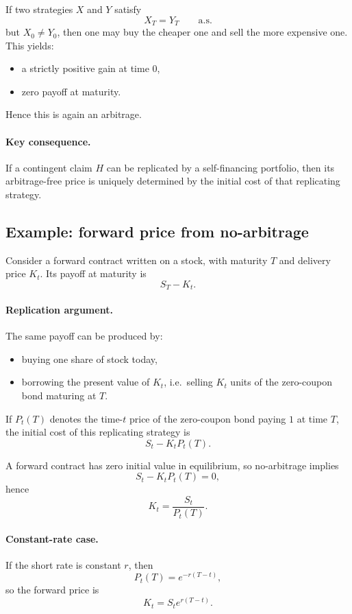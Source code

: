 \documentclass[11pt]{article}
\newcommand{\1}{\mathbf{1}}
\theoremstyle{plain}
\theoremstyle{definition}
\theoremstyle{remark}
\begin{document}
If two strategies \(X\) and \(Y\) satisfy
\[
X_T=Y_T \qquad \text{a.s.}
\]
but \(X_0\neq Y_0\), then one may buy the cheaper one and sell the more expensive one.
This yields:
\begin{itemize}
    \item a strictly positive gain at time \(0\),
    \item zero payoff at maturity.
\end{itemize}
Hence this is again an arbitrage.

\paragraph{Key consequence.}
If a contingent claim \(H\) can be replicated by a self-financing portfolio, then its arbitrage-free price is uniquely determined by the initial cost of that replicating strategy.

\subsection{Example: forward price from no-arbitrage}

Consider a forward contract written on a stock, with maturity \(T\) and delivery price \(K_t\).
Its payoff at maturity is
\[
S_T-K_t.
\]

\paragraph{Replication argument.}
The same payoff can be produced by:
\begin{itemize}
    \item buying one share of stock today,
    \item borrowing the present value of \(K_t\), i.e.\ selling \(K_t\) units of the zero-coupon bond maturing at \(T\).
\end{itemize}

If \(P_t(T)\) denotes the time-\(t\) price of the zero-coupon bond paying \(1\) at time \(T\), the initial cost of this replicating strategy is
\[
S_t-K_tP_t(T).
\]

A forward contract has zero initial value in equilibrium, so no-arbitrage implies
\[
S_t-K_tP_t(T)=0,
\]
hence
\[
\boxed{\ K_t=\frac{S_t}{P_t(T)}.\ }
\]

\paragraph{Constant-rate case.}
If the short rate is constant \(r\), then
\[
P_t(T)=e^{-r(T-t)},
\]
so the forward price is
\[
\boxed{\ K_t=S_t e^{r(T-t)}.\ }
\]
\end{document}
